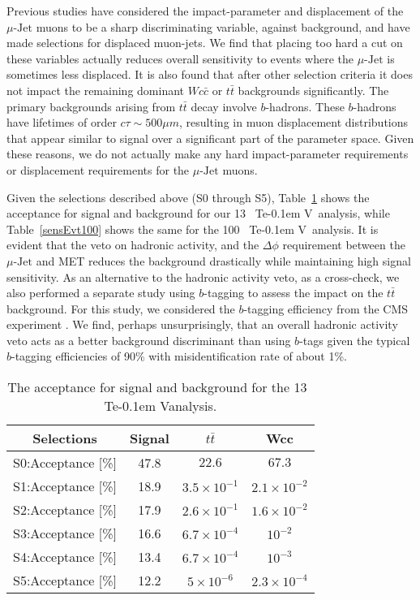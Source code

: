 \documentclass[reprint,doublecolumn,secnumarabic,amssymb, amsmath, aps,nofootinbib,superscriptaddress]{revtex4-1}
\newcommand{\Tab}[1]{Table~\ref{#1}}
\def\TeV{\ifmmode {\mathrm{\ Te\kern -0.1em V}}\else
                   \textrm{Te\kern -0.1em V}\fi}%
\newcommand{\ttbar}{\ensuremath{t\bar{t}}}
\begin{document}
Previous studies have considered the impact-parameter and displacement of the $\mu\text{-Jet}$ muons to be a sharp discriminating variable, against background, and have made selections for displaced muon-jets. We find that placing too hard a cut on these variables actually reduces overall sensitivity to events where the $\mu\text{-Jet}$ is sometimes less displaced. It is also found that after other selection criteria it does not impact the remaining dominant $Wc\bar{c}$ or $t\bar{t}$ backgrounds significantly. The primary backgrounds arising from $\ttbar$ decay involve $b$-hadrons. These $b$-hadrons have lifetimes of order $c\tau\sim500\mu m$, resulting in muon displacement distributions that appear similar to signal over a significant part of the parameter space. Given these reasons, we do not actually make any hard impact-parameter requirements or displacement requirements for the $\mu\text{-Jet}$ muons.

				
Given the selections described above (S0 through S5), \Tab{sensEvt13} shows the acceptance for signal and background for our 13~\TeV\ analysis, while \Tab{sensEvt100} shows the same for the 100~\TeV\ analysis. It is evident that the veto on hadronic activity, and the $\Delta\phi$ requirement between the $\mu\text{-Jet}$ and MET reduces the background drastically while maintaining high signal sensitivity. As an alternative to the hadronic activity veto, as a cross-check, we also performed a separate study using $b$-tagging to assess the impact on the $\ttbar$ background. For this study, we considered the $b$-tagging efficiency from the CMS experiment \cite{CMS:2016btag}. We find, perhaps unsurprisingly, that an overall hadronic activity veto acts as a better background discriminant than using $b$-tags given the typical $b$-tagging efficiencies of 90\% with misidentification rate of about 1\%. 


\begin{table}[h]
\caption{ The acceptance for signal and background for the 13~\TeV analysis. \label{sensEvt13} }
\begin{center}
\begin{tabular}{c  c  c  c }
  \hline \hline
   Selections & Signal & $\ttbar$ & Wcc  \\
  \hline
   S0:Acceptance [\%] & 47.8 & $22.6$ & $67.3$ \\
   S1:Acceptance [\%] & 18.9 & $3.5\times 10^{-1}$ & $2.1\times 10^{-2}$ \\
   S2:Acceptance [\%] & 17.9 & $2.6\times 10^{-1}$ & $1.6\times 10^{-2}$ \\
   S3:Acceptance [\%] & 16.6 & $6.7\times 10^{-4}$ & $10^{-2}$  \\
   S4:Acceptance [\%]  & 13.4 & $6.7\times 10^{-4}$ & $10^{-3}$  \\
   S5:Acceptance [\%]  & 12.2 & $5\times 10^{-6}$ & $2.3\times 10^{-4}$  \\  
  \hline
\hline
\end{tabular}
\end{center}
\end{table}       
\end{document}
